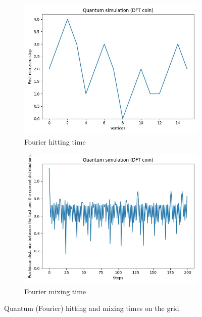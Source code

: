 \begin{figure}[H]
  \centering
  \begin{subfigure}{.45\linewidth}
    \centering
    \includegraphics[width=\linewidth]{./figures/results/grid/dft_hitting_time.jpg}
    \caption{Fourier hitting time}
  \end{subfigure}
  \begin{subfigure}{.45\linewidth}
    \centering
    \includegraphics[width=\linewidth]{./figures/results/grid/dft_mixing_time.jpg}
    \caption{Fourier mixing time}
  \end{subfigure}
  \caption{Quantum (Fourier) hitting and mixing times on the grid}
\end{figure}


